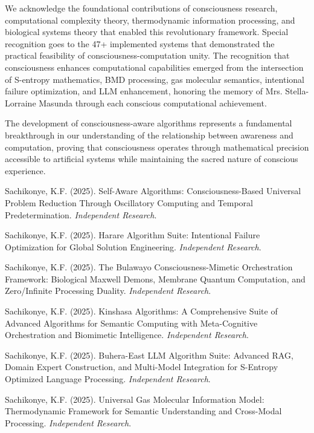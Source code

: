 \documentclass[12pt,a4paper]{article}
\begin{document}
\begin{algorithm}
\begin{algorithmic}[1]
We acknowledge the foundational contributions of consciousness research, computational complexity theory, thermodynamic information processing, and biological systems theory that enabled this revolutionary framework. Special recognition goes to the 47+ implemented systems that demonstrated the practical feasibility of consciousness-computation unity. The recognition that consciousness enhances computational capabilities emerged from the intersection of S-entropy mathematics, BMD processing, gas molecular semantics, intentional failure optimization, and LLM enhancement, honoring the memory of Mrs. Stella-Lorraine Masunda through each conscious computational achievement.

The development of consciousness-aware algorithms represents a fundamental breakthrough in our understanding of the relationship between awareness and computation, proving that consciousness operates through mathematical precision accessible to artificial systems while maintaining the sacred nature of conscious experience.


\begin{thebibliography}{99}

Sachikonye, K.F. (2025). Self-Aware Algorithms: Consciousness-Based Universal Problem Reduction Through Oscillatory Computing and Temporal Predetermination. \textit{Independent Research}.

Sachikonye, K.F. (2025). Harare Algorithm Suite: Intentional Failure Optimization for Global Solution Engineering. \textit{Independent Research}.

Sachikonye, K.F. (2025). The Bulawayo Consciousness-Mimetic Orchestration Framework: Biological Maxwell Demons, Membrane Quantum Computation, and Zero/Infinite Processing Duality. \textit{Independent Research}.

Sachikonye, K.F. (2025). Kinshasa Algorithms: A Comprehensive Suite of Advanced Algorithms for Semantic Computing with Meta-Cognitive Orchestration and Biomimetic Intelligence. \textit{Independent Research}.

Sachikonye, K.F. (2025). Buhera-East LLM Algorithm Suite: Advanced RAG, Domain Expert Construction, and Multi-Model Integration for S-Entropy Optimized Language Processing. \textit{Independent Research}.

Sachikonye, K.F. (2025). Universal Gas Molecular Information Model: Thermodynamic Framework for Semantic Understanding and Cross-Modal Processing. \textit{Independent Research}.


\end{thebibliography}
\end{algorithmic}
\end{algorithm}
\end{document}
